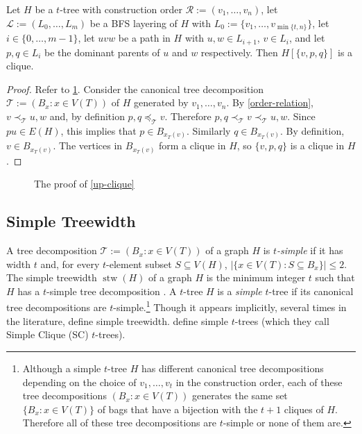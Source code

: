 \documentclass[kpfonts]{patmorin}
\DeclareMathOperator{\stw}{stw}
\theoremstyle{named}
\begin{document}
\begin{obs}\label{up-clique}
    Let $H$ be a $t$-tree with construction order $\mathcal{R}:=(v_1,\ldots,v_n)$, let $\mathcal{L}:=(L_0,\ldots,L_m)$ be a BFS layering of $H$ with $L_0:=\{v_1,\ldots,v_{\min\{t,n\}}\}$, let $i\in\{0,\ldots,m-1\}$, let $uvw$ be a path in $H$ with $u,w\in L_{i+1}$, $v\in L_{i}$, and let $p,q\in L_{i}$ be the dominant parents of $u$ and $w$ respectively.  Then $H[\{v,p,q\}]$ is a clique.
\end{obs}


\begin{proof}
    Refer to \cref{up-clique-figure}. Consider the canonical tree decomposition $\mathcal{T}:=(B_x:x\in V(T))$ of $H$ generated by $v_1,\ldots,v_n$.  By \cref{order-relation}, $v\prec_{\mathcal{T}} u,w$ and, by definition $p,q\preceq_{\mathcal{T}} v$.  Therefore $p,q\prec_{\mathcal{T}} v\prec_{\mathcal{T}} u,w$.  Since $pu\in E(H)$, this implies that $p\in B_{x_T(v)}$.  Similarly $q\in B_{x_T(v)}$.  By definition, $v\in B_{x_T(v)}$.  The vertices in $B_{x_T(v)}$ form a clique in $H$, so $\{v,p,q\}$ is a clique in $H$.
\end{proof}

\begin{figure}
    \caption{The proof of \cref{up-clique}}
    \label{up-clique-figure}
\end{figure}

\subsection{Simple Treewidth}


A tree decomposition $\mathcal{T}:=(B_x:x\in V(T))$ of a graph $H$ is \emph{$t$-simple} if it has width $t$ and, for every $t$-element subset $S\subseteq V(H)$, $|\{x\in V(T):S\subseteq B_x\}|\le 2$.  The simple treewidth $\stw(H)$ of a graph $H$ is the minimum integer $t$ such that $H$ has a $t$-simple tree decomposition \cite{knauer.ueckerdt:simple}.  A $t$-tree $H$ is a \emph{simple} $t$-tree if its canonical tree decompositions are $t$-simple.\footnote{Although a simple $t$-tree $H$ has different canonical tree decompositions depending on the choice of $v_1,\ldots,v_t$ in the construction order, each of these tree decompositions $(B_x:x\in V(T))$ generates the same set $\{B_x:x\in V(T)\}$ of bags that have a bijection with the $t+1$ cliques of $H$.  Therefore all of these tree decompositions are $t$-simple or none of them are.}  Though it appears implicitly, several times in the literature, \citet{knauer.ueckerdt:simple} define simple treewidth.  \citet{markenzon.justel.ea:subclasses} define simple $t$-trees (which they call Simple Clique (SC) $t$-trees).
\end{document}
